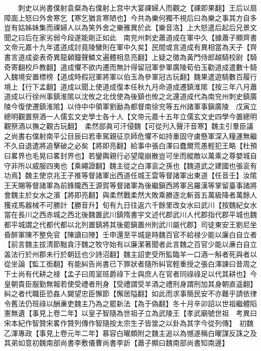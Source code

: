 　　刺史以尚書僕射袁粲為右僕射上宫中大宴祼婦人而觀之【祼即果翻】王后以扇障面上怒曰外舍寒乞【寒乞猶言寒陋也】今共為樂何獨不視后曰為樂之事其方自多豈有姑姊妹集而祼婦人以為笑外舍之樂雅異於此【樂音洛】上大怒遣后起后兄景文聞之曰后在家劣弱今段遂能剛正如此　南兖州刺史蕭道成在軍中久【據蕭子顯齊書文帝元嘉十九年遣道成討竟陵蠻則在軍中久矣】民間或言道成有異相當為天子【齊書言道成姿表奇異龍顙鐘聲鱗文遍體相息亮翻】上疑之徵為黃門侍郎越騎校尉【騎奇寄翻校戶教翻】道成懼不欲内遷而無計得留冠軍參軍廣陵荀伯玉勸道成遣數十騎入魏境安置標榜【道成時假冠軍將軍以伯玉為參軍冠古玩翻】魏果遣遊騎數百履行境上【行下孟翻】道成以聞上使道成復本任秋九月命道成遷鎮淮隂【按三年八月蕭道成以行徐州事鎮淮隂以沈攸之北伐使為後鎮也攸之北還道成代為南兖州刺史鎮廣陵今復使遷鎮淮隂】以侍中中領軍劉勔為都督南徐兖等五州諸軍事鎭廣陵　戊寅立總明觀置祭酒一人儒玄文史學士各十人【文帝元嘉十五年立儒玄文史四學今置總明觀祭酒以撫之觀古玩翻】　柔然部眞可汗侵魏【可從刋入聲汗音寒】魏主引羣臣議之尚書右僕射南平公目辰曰若車駕親征京師危懼不如持重固守虜懸軍深入糧運無繼不久自退遣將追擊破之必矣【將即亮翻】給事中張白澤曰蠢爾荒愚輕犯王略【杜預曰畧界也毛晃曰畧封界也】若鑾輿親行必望麾崩散豈可坐而縱敵以萬乘之尊嬰城自守非所以威服四夷也【乘繩證翻】魏主從之白澤衮之孫也【魏道武之建國也張衮有功焉】魏主使京兆王子推等督諸軍出西道任城王雲等督諸軍出東道【任音壬】汝隂王天賜等督諸軍為前鋒隴西王源賀等督諸軍為後繼鎭西將軍呂羅漢等掌留臺事諸將會魏主於女水之濱【將即亮翻】與柔然戰柔然大敗乘勝逐北斬首五萬級降者萬餘人獲戎馬器械不可勝計【勝音升】旬有九日往返六千餘里改女水曰武川【按魏紀女水當在長川之西赤城之西北後魏置武川鎮隋書宇文述代郡武川人代郡指代郡平城也魏都平城謂之代都代都以北列置鎮將其後罷鎭置州則武川屬代郡】司徒東安王劉尼坐昏醉軍陳不整免官【陳讀曰陣】壬申還至平城是時魏百官不給禄少能以廉白自立者【前言魏主拔清節黜貪汙魏之牧守始有以廉潔著聞者此言魏之百官少能以亷白自立盖法行於州郡未行於朝廷也少詩沼翻】魏主詔吏受所監臨羊一口酒一斛者死與者以從坐論【監工銜翻】有能糾告尚書已下罪狀者隨所糾官輕重授之張白澤諫曰昔周之下士尚有代耕之禄【孟子曰周室班爵祿下士與庶人在官者同祿祿足以代其耕也】今皇朝貴臣服勤無報若使受禮者刑身【受禮謂受羊酒之禮刑身謂刑加其身朝直遥翻】糾之者代職臣恐姦人闚望忠臣懈節【懈居隘翻】如此而求事簡民安不亦難乎請依律令舊法仍班祿以酬亷吏魏主乃為之罷新法【為于偽翻】冬十月辛卯詔以世祖繼體䧟憲無遺【事見上卷二年】以皇子智隨為世祖子立為武陵王【孝武廟號世祖　考異曰宋本紀作智贊宋畧作贊列傳作智隨按太宗生子皆筮之以卦為其字今從列傳】　初魏乙渾專政【事見上卷元年二年】慕容白曜頗附之魏主追以為憾遂稱白曜謀反誅之及其弟如意初魏南部尚書李敷儀曹尚書李訢【蕭子顯曰魏南部尚書知南邊】

